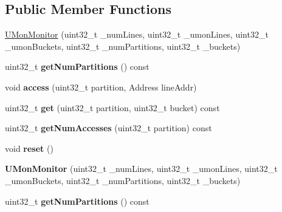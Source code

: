 \subsection*{Public Member Functions}
\begin{DoxyCompactItemize}
\item 
\hyperlink{classUMonMonitor_a695c9d9dd2ffc4e565dee9a5201c4e54}{U\-Mon\-Monitor} (uint32\-\_\-t \-\_\-num\-Lines, uint32\-\_\-t \-\_\-umon\-Lines, uint32\-\_\-t \-\_\-umon\-Buckets, uint32\-\_\-t \-\_\-num\-Partitions, uint32\-\_\-t \-\_\-buckets)
\item 
\hypertarget{classUMonMonitor_a885626520f51a7775eb86ca93d62776c}{uint32\-\_\-t {\bfseries get\-Num\-Partitions} () const }\label{classUMonMonitor_a885626520f51a7775eb86ca93d62776c}

\item 
\hypertarget{classUMonMonitor_a6f0c0aad7db23d24d83c820958c49cf0}{void {\bfseries access} (uint32\-\_\-t partition, Address line\-Addr)}\label{classUMonMonitor_a6f0c0aad7db23d24d83c820958c49cf0}

\item 
\hypertarget{classUMonMonitor_ada5f47d3cd588a87b311623ce5a832fa}{uint32\-\_\-t {\bfseries get} (uint32\-\_\-t partition, uint32\-\_\-t bucket) const }\label{classUMonMonitor_ada5f47d3cd588a87b311623ce5a832fa}

\item 
\hypertarget{classUMonMonitor_a0790a248dd66d17d48c5e03e90710076}{uint32\-\_\-t {\bfseries get\-Num\-Accesses} (uint32\-\_\-t partition) const }\label{classUMonMonitor_a0790a248dd66d17d48c5e03e90710076}

\item 
\hypertarget{classUMonMonitor_a2775c56d25bffddbff76745844f756c7}{void {\bfseries reset} ()}\label{classUMonMonitor_a2775c56d25bffddbff76745844f756c7}

\item 
\hypertarget{classUMonMonitor_a695c9d9dd2ffc4e565dee9a5201c4e54}{{\bfseries U\-Mon\-Monitor} (uint32\-\_\-t \-\_\-num\-Lines, uint32\-\_\-t \-\_\-umon\-Lines, uint32\-\_\-t \-\_\-umon\-Buckets, uint32\-\_\-t \-\_\-num\-Partitions, uint32\-\_\-t \-\_\-buckets)}\label{classUMonMonitor_a695c9d9dd2ffc4e565dee9a5201c4e54}

\item 
\hypertarget{classUMonMonitor_a885626520f51a7775eb86ca93d62776c}{uint32\-\_\-t {\bfseries get\-Num\-Partitions} () const }\label{classUMonMonitor_a885626520f51a7775eb86ca93d62776c}


\end{DoxyCompactItemize}
